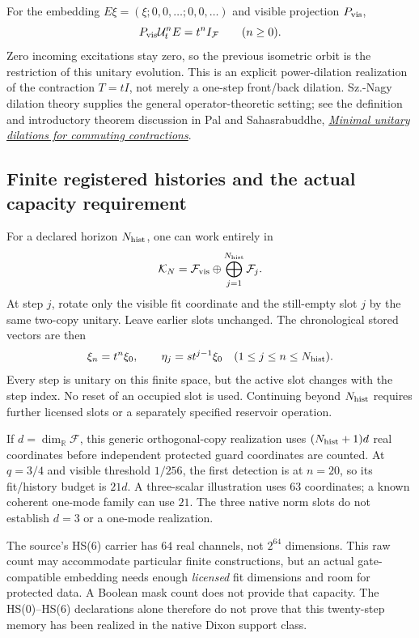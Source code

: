\documentclass[11pt,a4paper]{article}
\begin{document}
For the embedding $E\xi=(\xi;0,0,\ldots;0,0,\ldots)$ and visible
projection $P_{\rm vis}$,
\[
 P_{\rm vis}\mathcal U_t^n E=t^nI_{\mathcal F}
 \qquad(n\ge0).
\]
Zero incoming excitations stay zero, so the previous isometric orbit
is the restriction of this unitary evolution. This is an explicit
power-dilation realization of the contraction $T=tI$, not merely a
one-step front/back dilation. Sz.-Nagy dilation theory supplies the
general operator-theoretic setting; see the definition and introductory
theorem discussion in Pal and Sahasrabuddhe,
\href{https://arxiv.org/html/2205.09093}{\emph{Minimal unitary dilations for commuting contractions}}.

\subsection{Finite registered histories and the actual capacity requirement}
For a declared horizon $N_{\rm hist}$, one can work entirely in
\[
 \mathcal K_N=\mathcal F_{\rm vis}
 \oplus\bigoplus_{j=1}^{N_{\rm hist}}\mathcal F_j.
\]
At step $j$, rotate only the visible fit coordinate and the still-empty
slot $j$ by the same two-copy unitary. Leave earlier slots unchanged.
The chronological stored vectors are then
\[
 \xi_n=t^n\xi_0,\qquad
 \eta_j=st^{j-1}\xi_0\quad(1\le j\le n\le N_{\rm hist}).
\]
Every step is unitary on this finite space, but the active slot changes
with the step index. No reset of an occupied slot is used. Continuing
beyond $N_{\rm hist}$ requires further licensed slots or a separately
specified reservoir operation.

If $d=\dim_{\mathbb R}\mathcal F$, this generic orthogonal-copy
realization uses $(N_{\rm hist}+1)d$ real coordinates before independent
protected guard coordinates are counted. At $q=3/4$ and visible
threshold $1/256$, the first detection is at $n=20$, so its fit/history
budget is $21d$. A three-scalar illustration uses $63$ coordinates;
a known coherent one-mode family can use $21$. The three native norm
slots do not establish $d=3$ or a one-mode realization.

The source's HS(6) carrier has $64$ real channels, not $2^{64}$ dimensions.
This raw count may accommodate particular finite constructions, but an
actual gate-compatible embedding needs enough \emph{licensed} fit
dimensions and room for protected data. A Boolean mask count does not
provide that capacity. The HS(0)--HS(6) declarations alone therefore do
not prove that this twenty-step memory has been realized in the native
Dixon support class.
\end{document}
